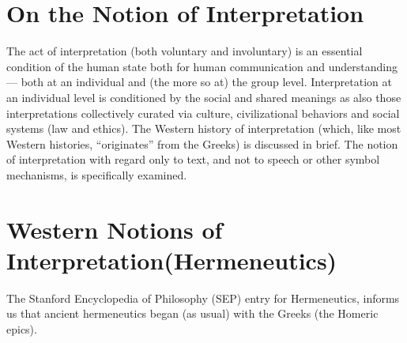 \section*{On the Notion of Interpretation}

The act of interpretation (both voluntary and involuntary) is an essential condition of the human state both for human communication and understanding — both at an individual and (the more so at) the group level. Interpretation at an individual level is conditioned by the social and shared meanings as also those interpretations collectively curated via culture, civilizational behaviors and social systems (law and ethics). The Western history of interpretation (which, like most Western histories, “originates” from the Greeks) is discussed in brief. The notion of interpretation with regard only to text, and not to speech or other symbol mechanisms, is specifically examined.

\newpage

\section*{Western Notions of Interpretation\hfil \break (Hermeneutics)}

The Stanford Encyclopedia of Philosophy (SEP) entry for Herme\-neutics, informs us that ancient hermeneutics began (as usual) with the Greeks (the Homeric epics).

